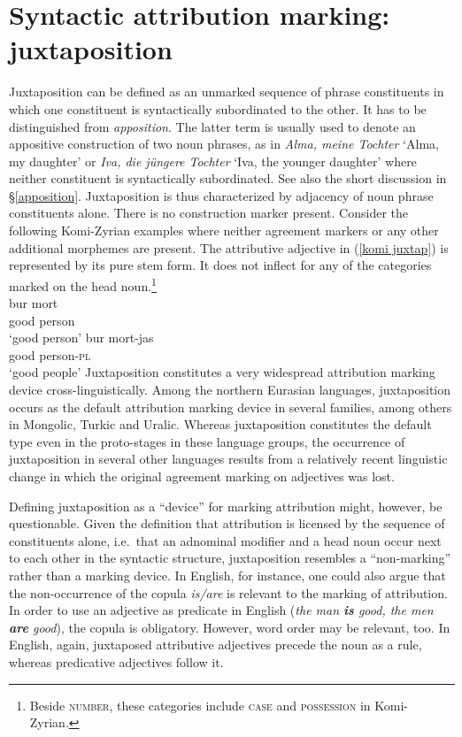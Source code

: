 \section[Juxtaposition]{Syntactic attribution marking: juxtaposition} \label{juxtaposition}
Juxtaposition can be defined as an unmarked sequence of phrase constituents in which one constituent is syntactically subordinated to the other. It  has to be distinguished from \emph{apposition}. The latter term is usually used to denote an appositive construction of two noun phrases, as in \textit{Alma, meine Tochter} ‘Alma, my daughter’ or \textit{Iva, die jüngere Tochter} ‘Iva, the younger daughter’ where neither constituent is syntactically subordinated. See also the short discussion in \S\ref{apposition}. Juxtaposition is thus characterized by adjacency of noun phrase constituents alone. There is no construction marker present. Consider the following Komi-Zyrian examples where neither agreement markers or any other additional morphemes are present. The attributive adjective in (\ref{komi juxtap}) is represented by its pure stem form. It does not inflect for any of the categories marked on the head noun.\footnote{Beside \textsc{number}, these categories include \textsc{case} and \textsc{possession} in Komi-Zyrian.}
\ea
{}\\
\ea
\gll 	bur 	mort\\
		good	person\\
\glt		‘good person’
\ex
\gll 	bur	mort-jas\\
		good	person-\textsc{pl}\\
\glt		‘good people’
\z
\z
Juxtaposition constitutes a very widespread attribution marking device cross-linguistically. Among the northern Eurasian languages, juxtaposition occurs as the default attribution marking device in several families, among others in Mongolic, Turkic and Uralic. Whereas juxtaposition constitutes the default type even in the proto-stages in these language groups, the occurrence of juxtaposition in several other languages results from a relatively recent linguistic change in which the original agreement marking on adjectives was lost.

Defining juxtaposition as a “device” for marking attribution might, however, be questionable. Given the definition that attribution is licensed by the sequence of constituents alone, i.e.~that an adnominal modifier and a head noun occur next to each other in the syntactic structure, juxtaposition resembles a “non-marking” rather than a marking device. In English, for instance, one could also argue that the non-occurrence of the copula \textit{is\fshyp{}are} is relevant to the marking of attribution. In order to use an adjective as predicate in English (\textit{the man \textbf{is} good, the men \textbf{are} good}), the copula is obligatory. However, word order may be relevant, too. In English, again, juxtaposed attributive adjectives precede the noun as a rule, whereas predicative adjectives follow it. 

